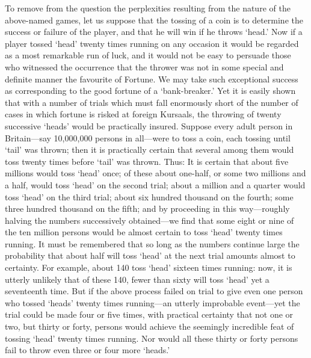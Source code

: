 \documentclass[letterpaper,12pt,oneside,openany]{memoir}
\begin{document}
To remove from the question the perplexities resulting
from the nature of the above-named games, let
us suppose that the tossing of a coin is to determine
the success or failure of the player, and that he will
win if he throws `head.' Now if a player tossed `head'
twenty times running on any occasion it would be
regarded as a most remarkable run of luck, and it
would not be easy to persuade those who witnessed the
occurrence that the thrower was not in some special
and definite manner the favourite of Fortune. We may
take such exceptional success as corresponding to the
good fortune of a `bank-breaker.' Yet it is easily
shown that with a number of trials which must fall
enormously short of the number of cases in which
fortune is risked at foreign Kursaals, the throwing of
twenty successive `heads' would be practically insured.
Suppose every adult person in Britain---say 10,000,000
persons in all---were to toss a coin, each tossing until
`tail' was thrown; then it is practically certain that
several among them would toss twenty times before
`tail' was thrown. Thus: It is certain that about five
millions would toss `head' once; of these about one-half,
or some two millions and a half, would toss `head'
on the second trial; about a million and a quarter
would toss `head' on the third trial; about six hundred
thousand on the fourth; some three hundred thousand
on the fifth; and by proceeding in this way---roughly
halving the numbers successively obtained---we find
that some eight or nine of the ten million persons
would be almost certain to toss `head' twenty times
running. It must be remembered that so long as
the numbers continue large the probability that about
half will toss `head' at the next trial amounts almost
to certainty. For example, about 140 toss `head'
sixteen times running: now, it is utterly unlikely that
of these 140, fewer than sixty will toss `head' yet a
seventeenth time. But if the above process failed on
trial to give even one person who tossed `heads'
twenty times running---an utterly improbable
event---yet the trial could be made four or five times, with
practical certainty that not one or two, but thirty or
forty, persons would achieve the seemingly incredible
feat of tossing `head' twenty times running. Nor
would all these thirty or forty persons fail to throw
even three or four more `heads.'
\end{document}
